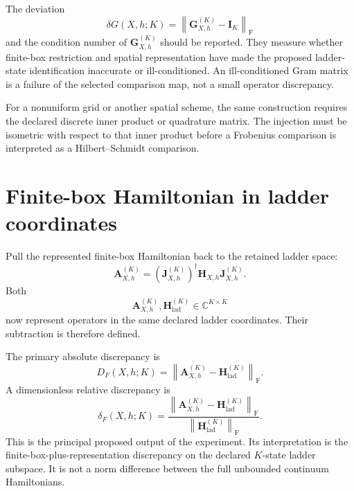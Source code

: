 The deviation
\begin{equation}
    \delta G(X,h;K)
    =
    \left\lVert
        \mathbf G_{X,h}^{(K)}-\mathbf I_K
    \right\rVert_{\mathrm F}
\end{equation}
and the condition number of $\mathbf G_{X,h}^{(K)}$ should be reported. They
measure whether finite-box restriction and spatial representation have made
the proposed ladder-state identification inaccurate or ill-conditioned. An
ill-conditioned Gram matrix is a failure of the selected comparison map, not a
small operator discrepancy.

For a nonuniform grid or another spatial scheme, the same construction requires
the declared discrete inner product or quadrature matrix. The injection must be
isometric with respect to that inner product before a Frobenius comparison is
interpreted as a Hilbert--Schmidt comparison.

\section*{Finite-box Hamiltonian in ladder coordinates}

Pull the represented finite-box Hamiltonian back to the retained ladder space:
\begin{equation}
    \mathbf A_{X,h}^{(K)}
    =
    \left(\mathbf J_{X,h}^{(K)}\right)^\dagger
    \mathbf H_{X,h}
    \mathbf J_{X,h}^{(K)}.
\end{equation}
Both
\begin{equation}
    \mathbf A_{X,h}^{(K)},
    \mathbf H_{\mathrm{lad}}^{(K)}
    \in
    \mathbb C^{K\times K}
\end{equation}
now represent operators in the same declared ladder coordinates. Their
subtraction is therefore defined.

The primary absolute discrepancy is
\begin{equation}
    D_F(X,h;K)
    =
    \left\lVert
        \mathbf A_{X,h}^{(K)}
        -
        \mathbf H_{\mathrm{lad}}^{(K)}
    \right\rVert_{\mathrm F}.
\end{equation}
A dimensionless relative discrepancy is
\begin{equation}
    \delta_F(X,h;K)
    =
    \frac{
        \left\lVert
            \mathbf A_{X,h}^{(K)}
            -
            \mathbf H_{\mathrm{lad}}^{(K)}
        \right\rVert_{\mathrm F}
    }{
        \left\lVert
            \mathbf H_{\mathrm{lad}}^{(K)}
        \right\rVert_{\mathrm F}
    }.
\end{equation}
This is the principal proposed output of the experiment. Its interpretation is
the finite-box-plus-representation discrepancy on the declared $K$-state
ladder subspace. It is not a norm difference between the full unbounded
continuum Hamiltonians.

